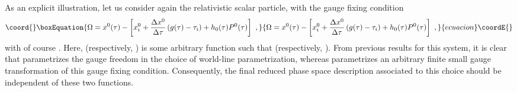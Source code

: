 \documentclass[a4paper,11pt]{article}
\begin{document}
As an explicit illustration, let us consider again the relativistic scalar 
particle, with the gauge fixing condition
\begin{equation}\coord{}\boxEquation{
\Omega=x^0(\tau)-\left[x^0_i+\frac{\Delta x^0}{\Delta\tau}
\left(g(\tau)-\tau_i\right)+h_0(\tau)P^0(\tau)\right]\ ,
\label{eq:Omega}
}{
\Omega=x^0(\tau)-\left[x^0_i+\frac{\Delta x^0}{\Delta\tau}
\left(g(\tau)-\tau_i\right)+h_0(\tau)P^0(\tau)\right]\ ,
}{ecuacion}\coordE{}\end{equation}
with of course \coordHE{}. Here, \coordHE{} 
(respectively, \coordHE{}) is some arbitrary function such that 
\coordHE{} (respectively, \coordHE{}). From previous 
results for this system, it
is clear that \coordHE{} parametrizes the gauge freedom in the choice of
world-line parametrization, whereas \coordHE{} parametrizes an arbitrary
finite small gauge transformation of this gauge fixing condition.
Consequently, the final reduced phase space description associated to
this choice should be independent of these two functions.
\end{document}
